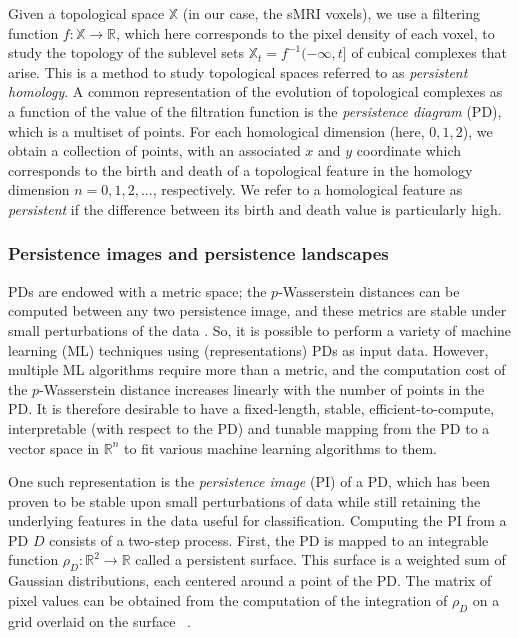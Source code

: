 \documentclass{article}
\begin{document}
Given a topological space $\mathbb{X}$ (in our case, the sMRI voxels), we use a filtering function
$f:\mathbb{X}\to\mathbb{R}$, which here corresponds to the pixel density of each voxel, to study the
topology of the sublevel sets $\mathbb{X}_t=f^{-1}(-\infty, t]$ of cubical complexes that arise.
This is a method to study topological spaces referred to as \emph{persistent homology}. A common
representation of the evolution of topological complexes as a function of the value of the
filtration function is the \emph{persistence diagram} (PD), which is a multiset of points. For each
homological dimension (here, $0,1,2$), we obtain a collection of points, with an associated $x$ and
$y$ coordinate which corresponds to the birth and death of a topological feature in the homology
dimension $n=0,1,2,\ldots$, respectively. We refer to a homological feature as \emph{persistent} if
the difference between its birth and death value is
particularly high.


\subsubsection{Persistence images and persistence landscapes}\label{sec:theory_persistence_landscape_persistence_image}

PDs are endowed with a metric space; the $p$-Wasserstein distances can be computed between any two
persistence image, and these metrics are stable under small perturbations of the data
\citep{skraba2020wasserstein}. So, it is possible to perform a variety of machine learning (ML)
techniques using (representations) PDs as input data. However, multiple ML algorithms require more than
a metric, and the computation cost of the $p$-Wasserstein distance increases linearly with the
number of points in the PD. It is therefore desirable to have a fixed-length, stable, efficient-to-compute,
interpretable (with respect to the PD) and tunable mapping from the PD to a vector space in
$\mathbb{R}^n$ to fit various machine learning algorithms to them.

One such representation is the \emph{persistence image} (PI) of a PD, which has been proven to be
stable upon small perturbations of data while still retaining the underlying features in the data
useful for classification. Computing the PI from a PD $D$ consists of
a two-step process. First, the PD is mapped to an integrable function $\rho_D : \mathbb{R}^2\to
\mathbb{R}$ called a persistent surface. This surface is a weighted sum of Gaussian distributions,
each centered around a point of the PD. The matrix of pixel values can be obtained from the
computation of the integration of $\rho_D$ on a grid overlaid on the surface
~\citep{adams2017persistence}.
\end{document}
